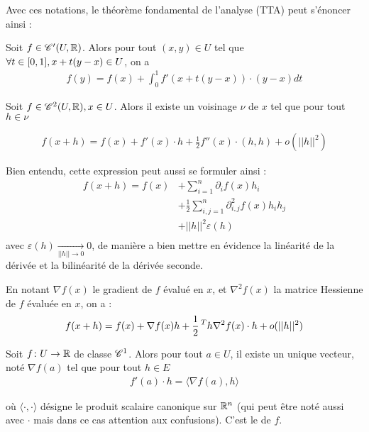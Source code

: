 \documentclass[french,a4paper,10pt]{article}
\begin{document}
	
	
	Avec ces notations, le théorème fondamental de l'analyse (TTA) peut s'énoncer ainsi :
	
	\begin{no-num-theorem}
		Soit $f\in\mathscr{C}'(U, \mathbb{R})$. Alors pour tout $(x, y)\in U$ tel que $\forall t\in\mathopen{[}0, 1\mathclose{]}, x+t(y-x)\in U$, on a
			\[\begin{aligned}
				f(y)=f(x) + \int_0^1f'(x+t(y-x))\cdot(y-x)dt
			\end{aligned}\]	
	\end{no-num-theorem}

	\begin{oc-young}
		Soit $f\in \mathscr{C}^2(U, \mathbb{R}), x\in U$. Alors il existe un voisinage $\nu$ de $x$ tel que pour tout $h\in \nu$
		
		\[\begin{aligned}
			f(x+h)=f(x)+f'(x)\cdot h+\frac12 f''(x)\cdot(h,h)+ o(||h||^2)
		\end{aligned}\]
		
		Bien entendu, cette expression peut aussi se formuler ainsi :
		\[\begin{aligned}
			f(x+h)=f(x)&+\sum_{i=1}^n\partial_i f(x)h_i\\&+\frac12\sum_{i,j=1}^n\partial_{i, j}^2f(x)h_ih_j\\&+||h||^2\varepsilon (h)\\
		\end{aligned}\]
		avec $\varepsilon(h)\underset{||h||\to 0}\to 0$, de manière a bien mettre en évidence la linéarité de la dérivée et la bilinéarité de la dérivée seconde.
		
		En notant $\nabla f(x)$ le gradient de $f$ évalué en $x$, et $\nabla^2 f(x)$ la matrice Hessienne de $f$ évaluée en $x$, on a :
			\[\begin{aligned}
				f(x+h)=f(x)+\nabla f(x)h+\frac12\prescript{T}{}{h} \nabla^2f(x)\cdot h+ o(||h||^2)
			\end{aligned}\]
	\end{oc-young}
	
	\begin{no-num-definition}
		Soit $f\colon U\to \mathbb{R}$ de classe $\mathscr{C}^1$. Alors pour tout $a\in U$, il existe un unique vecteur, noté $\nabla f(a)$ tel que pour tout $h\in E$
		\[\begin{aligned}
			f'(a)\cdot h=\langle\nabla f(a), h\rangle
		\end{aligned}\]
		
		où $\langle\cdot, \cdot\rangle $ désigne le produit scalaire canonique sur $\mathbb{R}^n$ (qui peut être noté aussi avec $\cdot$ mais dans ce cas attention aux confusions). C'est le  de $f$.
	\end{no-num-definition}
	
\end{document}
